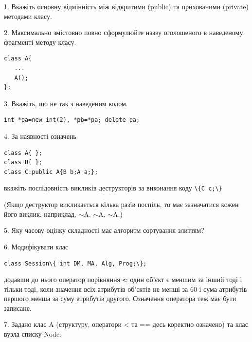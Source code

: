 \documentclass[12pt, ukrainian]{article}
\def\code#1{\Verb!#1!}
\begin{document}
{%
1. Вкажіть основну відмінність між відкритими (public) та прихованими (private) методами класу.%
\par
\vspace{2mm}
2. Максимально змістовно повно сформулюйте назву оголошеного в наведеному фрагменті методу класу.
\vspace{-3mm}
\begin{verbatim}class A{
   ...
   A();
};\end{verbatim}
\vspace{-3mm}
\par
\vspace{2mm}
3. Вкажіть, що не так з наведеним кодом.
\vspace{-3mm}
\begin{verbatim}int *pa=new int(2), *pb=*pa; delete pa;\end{verbatim}
\vspace{-3mm}
\par
\vspace{2mm}
4. За наявності означень
\vspace{-3mm}
\begin{verbatim}
class A{ };
class B{ };
class C:public A{B b;A a;};\end{verbatim}
\vspace{-3mm}
вкажіть послідовність викликів деструкторів за виконання коду \code{\{C c;\}} 

(Якщо деструктор викликається кілька разів поспіль, то має зазначатися кожен його виклик, наприклад, $\sim$A, $\sim$A, $\sim$A.)

\vspace{2mm}
5. Яку часову оцінку складності має алгоритм сортування злиттям?
\par
\vspace{2mm}
6. Модифікувати клас 

\qquad\code{class Session\{ int DM, MA, Alg, Prog;\};} 


додавши до нього оператор порівняння \code{<}: один об'єкт є меншим за інший тоді і тільки тоді, коли значення всіх атрибутів об'єктів не менші за 60 і сума атрибутів першого менша за суму атрибутів другого. Означення оператора теж має бути записане.%
\par
\vspace{2mm}
7. 
Задано клас A (структуру, оператори < та == десь коректно означено) та клас вузла списку Node.

}
\end{document}
